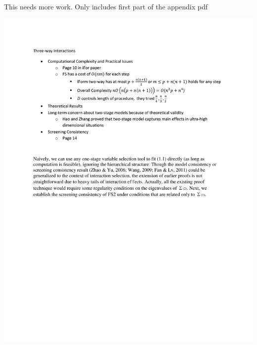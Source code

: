 \documentclass[11pt,]{book}
\theoremstyle{definition}
\theoremstyle{definition}
\theoremstyle{remark}
\begin{document}
This needs more work. Only includes first part of the appendix pdf

\begin{center} 
\includegraphics[width=8in]{appendix.pdf} 
\end{center}


\end{document}
